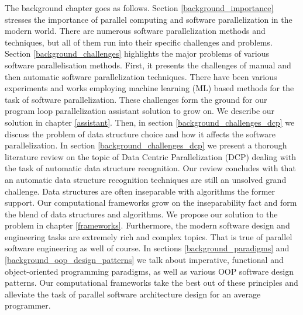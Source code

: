 %
% 
%

\quad The background chapter goes as follows. Section \ref{background_importance} stresses the importance of parallel computing and software parallelization in the modern world. There are numerous software parallelization methods and techniques, but all of them run into their specific challenges and problems. Section \ref{background_challenges} highlights the major problems of various software parallelisation methods. First, it presents the challenges of manual and then automatic software parallelization techniques. There have been various experiments and works employing machine learning (ML) based methods for the task of software parallelization. These challenges form the ground for our program loop parallelization assistant solution to grow on. We describe our solution in chapter \ref{assistant}. Then, in section \ref{background_challenges_dcp} we discuss the problem of data structure choice and how it affects the software parallelization. In section \ref{background_challenges_dcp} we present a thorough literature review on the topic of Data Centric Parallelization (DCP) dealing with the task of automatic data structure recognition. Our review concludes with that an automatic data structure recognition techniques are still an unsolved grand challenge. Data structures are often inseparable with algorithms the former support. Our computational frameworks grow on the inseparability fact and form the blend of data structures and algorithms. We propose our solution to the problem in chapter \ref{frameworks}. Furthermore, the modern software design and engineering tasks are extremely rich and complex topics. That is true of parallel software engineering as well of course. In sections \ref{background_paradigms} and \ref{background_oop_design_patterns} we talk about imperative, functional and object-oriented programming paradigms, as well as various OOP software design patterns. Our computational frameworks take the best out of these principles and alleviate the task of parallel software architecture design for an average programmer.

